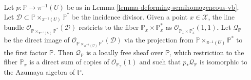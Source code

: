 \documentclass[12pt]{amsart}
\numberwithin{equation}{subsection}
\theoremstyle{plain}
\theoremstyle{definition}
\newcommand{\D}{{\mathcal D}}
\newcommand{\Q}{{\mathcal Q}}
\newcommand{\X}{{\mathcal X}}
\newcommand{\PP}{{\mathbb P}}
\newcommand{\StructureSheaf}[1]{{\mathcal O}_{#1}}
\begin{document}
Let $p:\PP\rightarrow \pi^{-1}(U)$ be as in Lemma \ref{lemma-deforming-semihomogeneous-vb}.
Let $\D\subset \PP\times_{\pi^{-1}(U)}\PP^*$ be the incidence divisor. Given a point $x\in\X$, the line bundle $\StructureSheaf{\PP\times_{\pi^{-1}(U)}\PP^*}(\D)$
restricts to the fiber $\PP_x\times\PP^*_x$ as $\StructureSheaf{\PP_x\times\PP^*_x}(1,1).$
Let $\Q_\PP$ be the direct image of $\StructureSheaf{\PP\times_{\pi^{-1}(U)}\PP^*}(\D)$ via the projection from $\PP\times_{\pi^{-1}(U)}\PP^*$ to the first factor $\PP$.
Then $\Q_\PP$ is a locally free sheaf over $\PP$, which restriction to the fiber $\PP_x$ is a direct sum of copies of $\StructureSheaf{\PP_x}(1)$ and such that $p_*\Q_\PP$
is isomorphic to the Azumaya algebra of $\PP$.

% 
\end{document}
